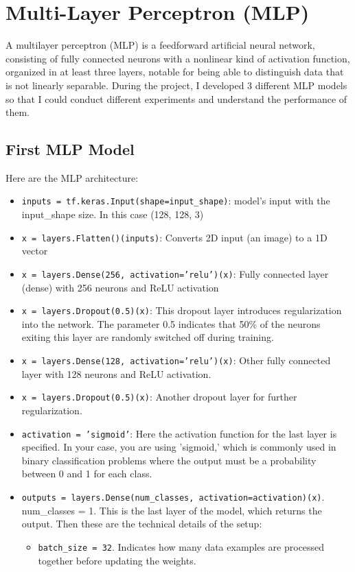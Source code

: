 \section{Multi-Layer Perceptron (MLP)}
A multilayer perceptron (MLP) is a feedforward artificial neural network, consisting of fully connected neurons with a nonlinear kind of activation function, organized in at least three layers, notable for being able to distinguish data that is not linearly separable. \cite{mlp}
During the project, I developed 3 different MLP models so that I could conduct different experiments and understand the performance of them.
\subsection{First MLP Model}
Here are the MLP architecture:
\begin{itemize}
\item \texttt{inputs = tf.keras.Input(shape=input\_shape)}: model's input with the input\_shape size. In this case (128, 128, 3)
\item \texttt{x = layers.Flatten()(inputs)}: Converts 2D input (an image) to a 1D vector
\item \texttt{x = layers.Dense(256, activation='relu')(x)}: Fully connected layer (dense) with 256 neurons and ReLU activation
\item \texttt{x = layers.Dropout(0.5)(x)}: This dropout layer introduces regularization into the network. The parameter 0.5 indicates that 50\% of the neurons exiting this layer are randomly switched off during training.
\item \texttt{x = layers.Dense(128, activation='relu')(x)}: Other fully connected layer with 128 neurons and ReLU activation.
\item \texttt{x = layers.Dropout(0.5)(x)}: Another dropout layer for further regularization.
\item \texttt{activation = 'sigmoid'}: Here the activation function for the last layer is specified. In your case, you are using 'sigmoid,' which is commonly used in binary classification problems where the output must be a probability between 0 and 1 for each class.
\item \texttt{outputs = layers.Dense(num\_classes, activation=activation)(x)}. 
num\_classes = 1. This is the last layer of the model, which returns the output.
Then these are the technical details of the setup:
\begin{itemize}
\item \texttt{batch\_size =  32}. Indicates how many data examples are processed together before updating the weights.

\end{itemize}
\end{itemize}
